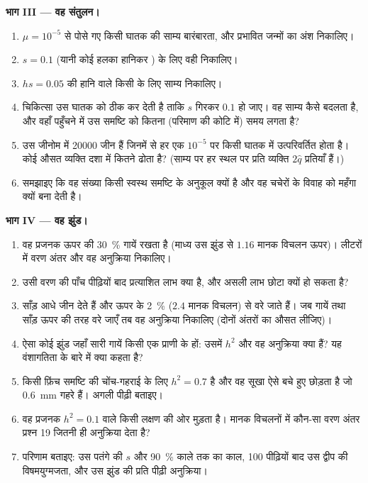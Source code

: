 \begin{problem}
\medskip
\noindent\textbf{भाग III --- वह संतुलन।}
\begin{enumerate}[resume]
  \item $\mu = 10^{-5}$ से पोसे गए किसी  घातक की
        साम्य बारंबारता, और प्रभावित जन्मों का अंश निकालिए।
  \item $s = 0.1$ (यानी कोई हलका हानिकर ) के लिए वही
        निकालिए।
  \item $hs = 0.05$ की  हानि वाले किसी  
        के लिए साम्य निकालिए।
  \item चिकित्सा उस घातक को ठीक कर देती है ताकि $s$ गिरकर $0.1$ हो जाए।
        वह साम्य कैसे बदलता है, और वहाँ पहुँचने में उस समष्टि को कितना
        (परिमाण की कोटि में) समय लगता है?
  \item उस जीनोम में \num{20000} जीन हैं जिनमें से हर एक $10^{-5}$ पर
        किसी  घातक में उत्परिवर्तित होता है। कोई औसत व्यक्ति  दशा में
        कितने  ढोता है? (साम्य पर
        हर स्थल पर प्रति व्यक्ति $2\hat q$ प्रतियाँ हैं।)
  \item समझाइए कि वह संख्या किसी स्वस्थ समष्टि के अनुकूल क्यों है और
        वह चचेरों के विवाह को महँगा क्यों बना देती है।
\end{enumerate}

\medskip
\noindent\textbf{भाग IV --- वह झुंड।}
\begin{enumerate}[resume]
  \item वह प्रजनक ऊपर की \qty{30}{\%} गायें रखता है (माध्य उस झुंड से $1.16$
        मानक विचलन ऊपर)। लीटरों में वरण
        अंतर और वह अनुक्रिया निकालिए।
  \item उसी वरण की पाँच पीढ़ियों बाद प्रत्याशित लाभ क्या है, और
        असली लाभ छोटा क्यों हो सकता है?
  \item साँड़ आधे जीन देते हैं और ऊपर के
        \qty{2}{\%} ($2.4$ मानक विचलन) से वरे जाते हैं। जब गायें तथा साँड़ ऊपर की तरह
        वरे जाएँ तब वह अनुक्रिया निकालिए (दोनों अंतरों का औसत लीजिए)।
  \item ऐसा कोई झुंड जहाँ सारी गायें किसी एक प्राणी के  हों: उसमें
        $h^{2}$ और वह अनुक्रिया क्या हैं? यह वंशागतिता के बारे में
        क्या कहता है?
  \item किसी फ़िंच समष्टि की चोंच-गहराई के लिए $h^{2} = 0.7$ है और
        वह सूखा ऐसे बचे हुए छोड़ता है जो \qty{0.6}{mm} गहरे हैं। अगली पीढ़ी बताइए।
  \item वह प्रजनक $h^{2} = 0.1$ वाले किसी लक्षण की ओर मुड़ता है। मानक
        विचलनों में कौन-सा वरण अंतर प्रश्न 19 जितनी ही अनुक्रिया देता है?
  \item परिणाम बताइए: उस पतंगे की $s$ और \qty{90}{\%} काले तक का काल,
        100 पीढ़ियों बाद उस द्वीप की विषमयुग्मजता,
        और उस झुंड की प्रति पीढ़ी अनुक्रिया।
\end{enumerate}
\end{problem}
